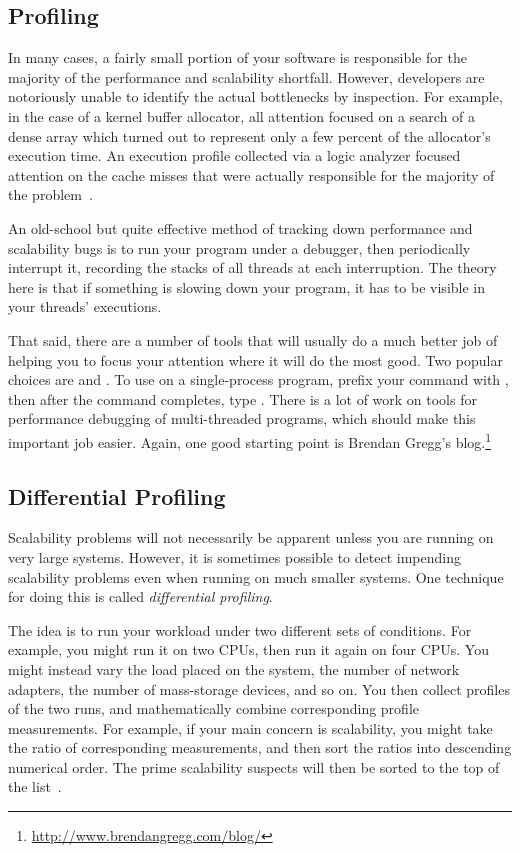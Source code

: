 \subsection{Profiling}
\label{sec:debugging:Profiling}

In many cases, a fairly small portion of your software is responsible
for the majority of the performance and scalability shortfall.
However, developers are notoriously unable to identify the actual
bottlenecks by inspection.
For example, in the case of a kernel buffer allocator, all attention focused
on a search of a dense array which turned out to represent only
a few percent of the allocator's execution time.
An execution profile collected via a logic analyzer focused attention
on the cache misses that were actually responsible for the majority
of the problem~\cite{McKenney93}.

An old-school but quite effective method of tracking down performance
and scalability bugs is to run your program under a debugger,
then periodically interrupt it, recording the stacks of all threads
at each interruption.
The theory here is that if something is slowing down your program,
it has to be visible in your threads' executions.

That said, there are a number of tools
that will usually do a much better job of helping you to focus your
attention where it will do the most good.
Two popular choices are  and .
To use  on a single-process program, prefix your command
with , then after the command completes, type
.
There is a lot of work on tools for performance debugging of multi-threaded
programs, which should make this important job easier.
Again, one good starting point is Brendan Gregg's blog.\footnote{
	\url{http://www.brendangregg.com/blog/}}

\subsection{Differential Profiling}
\label{sec:debugging:Differential Profiling}

Scalability problems will not necessarily be apparent unless you are running
on very large systems.
However, it is sometimes possible to detect impending scalability problems
even when running on much smaller systems.
One technique for doing this is called \emph{differential profiling}.

The idea is to run your workload under two different sets of conditions.
For example, you might run it on two CPUs, then run it again on four
CPUs.
You might instead vary the load placed on the system, the number of
network adapters, the number of mass-storage devices, and so on.
You then collect profiles of the two runs, and mathematically combine
corresponding profile measurements.
For example, if your main concern is scalability, you might take the
ratio of corresponding measurements, and then sort the ratios into
descending numerical order.
The prime scalability suspects will then be sorted to the top of the
list~\cite{McKenney95a,McKenney99b}.


